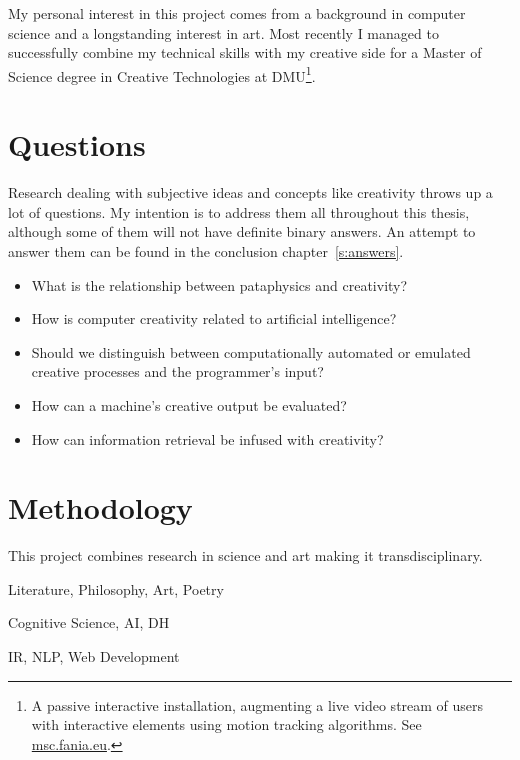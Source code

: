 \spirals

My personal interest in this project comes from a background in computer science and a longstanding interest in art. Most recently I managed to successfully combine my technical skills with my creative side for a Master of Science degree in Creative Technologies at \ac{DMU}\footnote{A passive interactive installation, augmenting a live video stream of users with interactive elements using motion tracking algorithms. See \url{msc.fania.eu}.}. 


\section{Questions}

Research dealing with subjective ideas and concepts like creativity throws up a lot of questions. My intention is to address them all throughout this thesis, although some of them will not have definite binary answers. An attempt to answer them can be found in the conclusion chapter~\ref{s:answers}.

\begin{itemize}
  \item What is the relationship between pataphysics and creativity?
  \item How is computer creativity related to artificial intelligence?
  \item Should we distinguish between computationally automated or emulated creative processes and the programmer's input?
  \item How can a machine's creative output be evaluated?
  \item How can information retrieval be infused with creativity?
\end{itemize}


\section{Methodology}
\label{s:intromethod}

This project combines research in science and art making it transdisciplinary.

\begin{description}[leftmargin=3cm]
  \item [Pataphysics] Literature, Philosophy, Art, Poetry
  \item [Creativity] Cognitive Science, \ac{AI}, \ac{DH}
  \item [Technology] \ac{IR}, \ac{NLP}, Web Development
\end{description}

